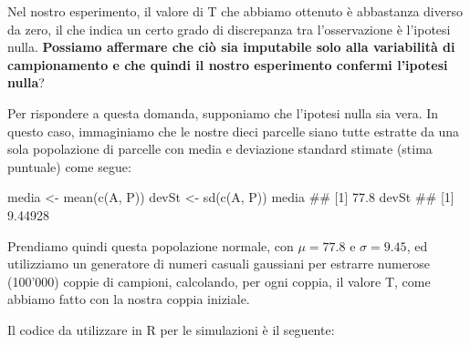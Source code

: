 \documentclass[a4paper,12pt,oneside]{book}
\newenvironment{Shaded}{\begin{snugshade}}{\end{snugshade}}
\newcommand{\DocumentationTok}[1]{#1}
\newcommand{\OtherTok}[1]{#1}
\newcommand{\FunctionTok}[1]{#1}
\newcommand{\NormalTok}[1]{#1}
\begin{document}
Nel nostro esperimento, il valore di T che abbiamo ottenuto è abbastanza diverso da zero, il che indica un certo grado di discrepanza tra l'osservazione è l'ipotesi nulla. \textbf{Possiamo affermare che ciò sia imputabile solo alla variabilità di campionamento e che quindi il nostro esperimento confermi l'ipotesi nulla}?

Per rispondere a questa domanda, supponiamo che l'ipotesi nulla sia vera. In questo caso, immaginiamo che le nostre dieci parcelle siano tutte estratte da una sola popolazione di parcelle con media e deviazione standard stimate (stima puntuale) come segue:

\begin{Shaded}
\begin{Highlighting}[]
\NormalTok{media }\OtherTok{\textless{}{-}} \FunctionTok{mean}\NormalTok{(}\FunctionTok{c}\NormalTok{(A, P))}
\NormalTok{devSt }\OtherTok{\textless{}{-}} \FunctionTok{sd}\NormalTok{(}\FunctionTok{c}\NormalTok{(A, P))}
\NormalTok{media}
\DocumentationTok{\#\# [1] 77.8}
\NormalTok{devSt}
\DocumentationTok{\#\# [1] 9.44928}
\end{Highlighting}
\end{Shaded}

Prendiamo quindi questa popolazione normale, con \(\mu = 77.8\) e \(\sigma = 9.45\), ed utilizziamo un generatore di numeri casuali gaussiani per estrarre numerose (100'000) coppie di campioni, calcolando, per ogni coppia, il valore T, come abbiamo fatto con la nostra coppia iniziale.

Il codice da utilizzare in R per le simulazioni è il seguente:
\end{document}
